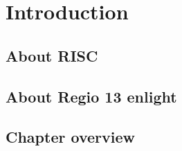 \section{Introduction}

\subsection{About RISC}

\subsection{About Regio 13 enlight}

\subsection{Chapter overview}
